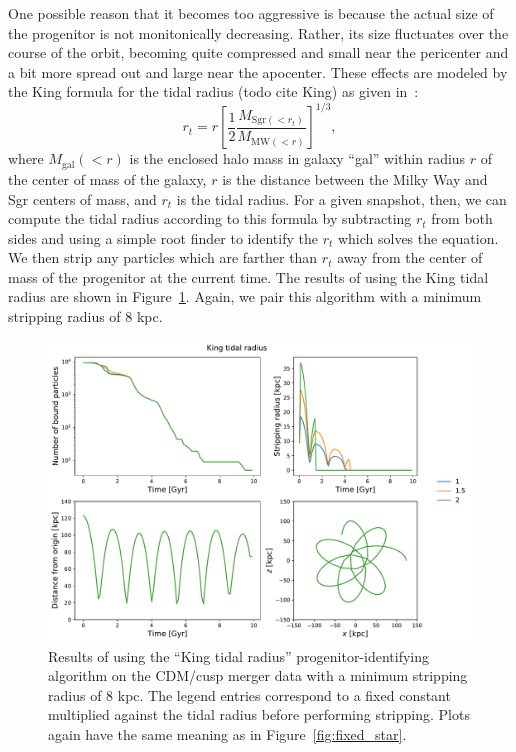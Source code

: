 One possible reason that it becomes too aggressive is because the actual
size of the progenitor is not monitonically decreasing.  Rather, its size
fluctuates over the course of the orbit, becoming quite compressed and small
near the pericenter and a bit more spread out and large near the apocenter.
These effects are modeled by the King formula for the tidal radius (todo cite
King) as given in~\cite{dierickx_predicted_2017}:
\begin{equation} \label{eq:king_radius}
    r_t = r \left[ \frac{1}{2} 
    \frac{M_{\text{Sgr}(<r_t)}}{M_{\text{MW}(<r)}} \right]^{1/3},
\end{equation}
where $M_{\text{gal}}(<r)$ is the enclosed halo mass in galaxy ``gal'' within
radius $r$ of the center of mass of the galaxy, $r$ is the distance between
the Milky Way and Sgr centers of mass, and $r_t$ is the tidal radius.  For a
given snapshot, then, we can compute the tidal radius according to this
formula by subtracting $r_t$ from both sides and using a simple root finder to
identify the $r_t$ which solves the equation.  We then strip any particles
which are farther than $r_t$ away from the center of mass of the progenitor at
the current time. The results of using the King tidal radius are shown in
Figure~\ref{fig:king_star}. Again, we pair this algorithm with a minimum
stripping radius of 8 kpc.

\begin{figure}
    \centering
    \includegraphics[width=0.9\linewidth]{figs/king_star.pdf}
    \caption{%
        Results of using the ``King tidal radius'' progenitor-identifying
        algorithm on the CDM/cusp merger data with a minimum stripping radius of
        8 kpc. The legend entries correspond to a fixed constant multiplied
        against the tidal radius before performing stripping. Plots again have
        the same meaning as in Figure~\ref{fig:fixed_star}.
    }
    \label{fig:king_star}
\end{figure}

